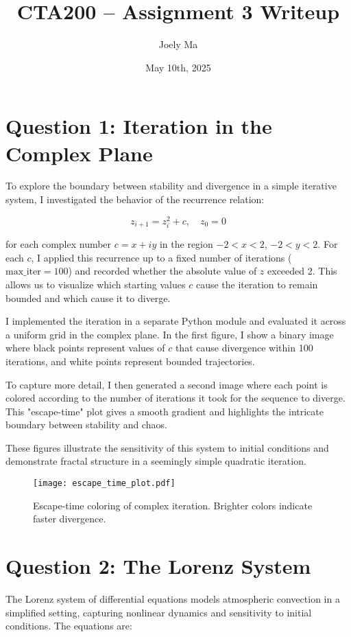 \documentclass[12pt]{article}
\title{CTA200 – Assignment 3 Writeup}
\author{Joely Ma}
\date{May 10th, 2025}
\begin{document}
\maketitle

\section*{Question 1: Iteration in the Complex Plane}

To explore the boundary between stability and divergence in a simple iterative system, I investigated the behavior of the recurrence relation:

\[
z_{i+1} = z_i^2 + c, \quad z_0 = 0
\]

for each complex number \( c = x + iy \) in the region \( -2 < x < 2 \), \( -2 < y < 2 \). For each \( c \), I applied this recurrence up to a fixed number of iterations (\( \text{max\_iter} = 100 \)) and recorded whether the absolute value of \( z \) exceeded 2. This allows us to visualize which starting values \( c \) cause the iteration to remain bounded and which cause it to diverge.

I implemented the iteration in a separate Python module and evaluated it across a uniform grid in the complex plane. In the first figure, I show a binary image where black points represent values of \( c \) that cause divergence within 100 iterations, and white points represent bounded trajectories.

To capture more detail, I then generated a second image where each point is colored according to the number of iterations it took for the sequence to diverge. This "escape-time" plot gives a smooth gradient and highlights the intricate boundary between stability and chaos.

These figures illustrate the sensitivity of this system to initial conditions and demonstrate fractal structure in a seemingly simple quadratic iteration.

\begin{figure}[H]
    \centering
    \texttt{[image: escape\_time\_plot.pdf]}
    \caption{Escape-time coloring of complex iteration. Brighter colors indicate faster divergence.}
\end{figure}

\section*{Question 2: The Lorenz System}

The Lorenz system of differential equations models atmospheric convection in a simplified setting, capturing nonlinear dynamics and sensitivity to initial conditions. The equations are:
\end{document}
